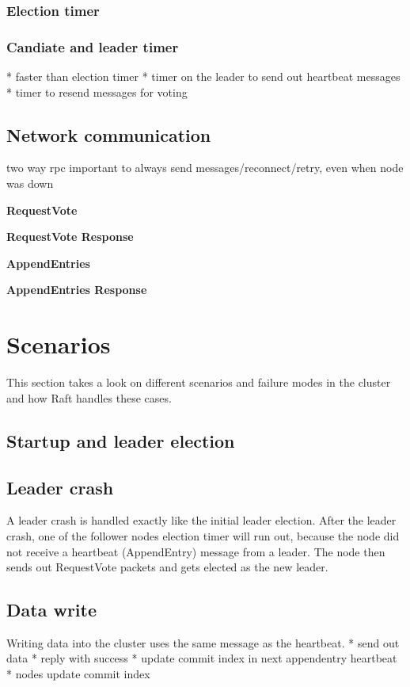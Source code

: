 \subsubsection*{Election timer}


\subsubsection*{Candiate and leader timer}
* faster than election timer
* timer on the leader to send out heartbeat messages
* timer to resend messages for voting







\subsection{Network communication}

two way rpc
important to always send messages/reconnect/retry, even when node was down

\textbf{RequestVote}

\textbf{RequestVote Response}

\textbf{AppendEntries}

\textbf{AppendEntries Response}

\section{Scenarios}
This section takes a look on different scenarios and failure modes in the cluster and how Raft handles these cases.

\subsection{Startup and leader election}

\subsection{Leader crash}
A leader crash is handled exactly like the initial leader election.
After the leader crash, one of the follower nodes election timer will run out, because the node did not receive a heartbeat (AppendEntry) message from a leader. The node then sends out 
RequestVote packets and gets elected as the new leader.

\subsection{Data write}
Writing data into the cluster uses the same message as the heartbeat.
* send out data
* reply with success
* update commit index in next appendentry heartbeat
* nodes update commit index

